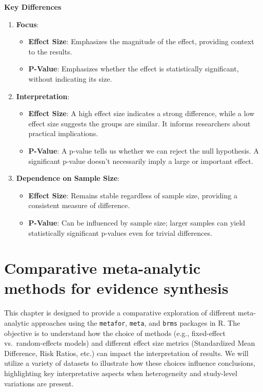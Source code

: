 \documentclass[
]{book}
\begin{document}
\textbf{Key Differences}

\begin{enumerate}
\def\labelenumi{\arabic{enumi}.}
\item
  \textbf{Focus}:

  \begin{itemize}
  \item
    \textbf{Effect Size}: Emphasizes the magnitude of the effect, providing context to the results.
  \item
    \textbf{P-Value}: Emphasizes whether the effect is statistically significant, without indicating its size.
  \end{itemize}
\item
  \textbf{Interpretation}:

  \begin{itemize}
  \item
    \textbf{Effect Size}: A high effect size indicates a strong difference, while a low effect size suggests the groups are similar.
    It informs researchers about practical implications.
  \item
    \textbf{P-Value}: A p-value tells us whether we can reject the null hypothesis.
    A significant p-value doesn't necessarily imply a large or important effect.
  \end{itemize}
\item
  \textbf{Dependence on Sample Size}:

  \begin{itemize}
  \item
    \textbf{Effect Size}: Remains stable regardless of sample size, providing a consistent measure of difference.
  \item
    \textbf{P-Value}: Can be influenced by sample size; larger samples can yield statistically significant p-values even for trivial differences.
  \end{itemize}
\end{enumerate}

\chapter{Comparative meta-analytic methods for evidence synthesis}\label{comparative-meta-analytic-methods-for-evidence-synthesis}

This chapter is designed to provide a comparative exploration of different meta-analytic approaches using the \texttt{metafor}, \texttt{meta}, and \texttt{brms} packages in R. The objective is to understand how the choice of methods (e.g., fixed-effect vs.~random-effects models) and different effect size metrics (Standardized Mean Difference, Risk Ratios, etc.) can impact the interpretation of results. We will utilize a variety of datasets to illustrate how these choices influence conclusions, highlighting key interpretative aspects when heterogeneity and study-level variations are present.
\end{document}
